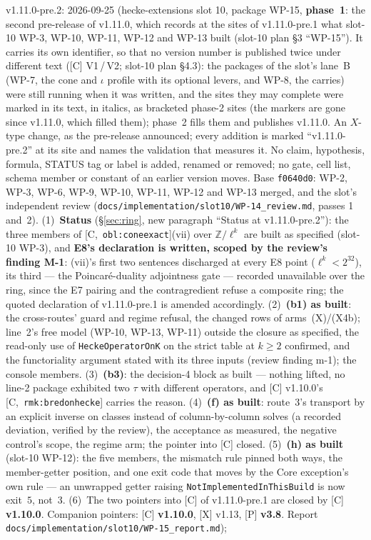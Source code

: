 \documentclass[11pt]{article}
\theoremstyle{remark}
\newcommand{\Z}{\mathbb{Z}}
\newcommand{\HA}[1]{[C,~\texttt{#1}]}      %
\begin{document}
v1.11.0-pre.2: 2026-09-25 (hecke-extensions slot 10, package WP-15,
\textbf{phase~1}: the second pre-release of v1.11.0, which records at the sites of
v1.11.0-pre.1 what slot-10 WP-3, WP-10, WP-11, WP-12 and WP-13 built (slot-10 plan \S3 ``WP-15'').
It carries its own identifier, so that no version number is published twice under different text
([C] V1\,/\,V2; slot-10 plan \S4.3): the packages of the slot's lane~B (WP-7, the cone and
$\iota$ profile with its optional levers, and WP-8, the carries) were still running when it was
written, and the sites they may complete were marked in its text, in italics, as bracketed
phase-2 sites (the markers are gone since v1.11.0, which filled them); phase~2 fills them and
publishes v1.11.0. An $X$-type change,
as the pre-release announced; every addition is marked ``v1.11.0-pre.2'' at its site and names the
validation that measures it. No claim, hypothesis, formula, STATUS tag or label is added, renamed
or removed; no gate, cell list, schema member or constant of an earlier version moves. Base
\texttt{f0640d0}: WP-2, WP-3, WP-6, WP-9, WP-10, WP-11, WP-12 and WP-13 merged, and the slot's
independent review (\texttt{docs/implementation/slot10/WP-14\_review.md}, passes 1 and~2).
(1)~\textbf{Status} (\S\ref{sec:ring}, new paragraph ``Status at v1.11.0-pre.2''): the three
members of \HA{obl:coneexact}(vii) over $\Z/\ell^k$ are built as specified (slot-10 WP-3), and
\textbf{E8's declaration is written, scoped by the review's finding M-1}: (vii)'s first two
sentences discharged at every E8 point ($\ell^k<2^{32}$), its third --- the Poincar\'e-duality
adjointness gate --- recorded unavailable over the ring, since the E7 pairing and the contragredient
refuse a composite ring; the quoted declaration of v1.11.0-pre.1 is amended accordingly.
(2)~\textbf{(b1) as built}: the cross-routes' guard and regime refusal, the changed rows of
arms~(X)/(X4b); line~2's free model (WP-10, WP-13, WP-11) outside the closure as specified, the
read-only use of \texttt{HeckeOperatorOnK} on the strict table at $k\ge2$ confirmed, and the
functoriality argument stated with its three inputs (review finding m-1); the console members.
(3)~\textbf{(b3)}: the decision-4 block as built --- nothing lifted, no line-2 package exhibited two
$\tau$ with different operators, and [C] v1.10.0's \HA{rmk:bredonhecke} carries the reason.
(4)~\textbf{(f) as built}: route~3's transport by an explicit inverse on classes instead of
column-by-column solves (a recorded deviation, verified by the review), the acceptance as measured,
the negative control's scope, the regime arm; the pointer into [C] closed.
(5)~\textbf{(h) as built} (slot-10 WP-12): the five members, the mismatch rule pinned both ways,
the member-getter position, and one exit code that moves by the Core exception's own rule --- an
unwrapped getter raising \texttt{NotImplementedInThisBuild} is now exit~$5$, not~$3$.
(6)~The two pointers into [C] of v1.11.0-pre.1 are closed by [C] \textbf{v1.10.0}.
Companion pointers: [C] \textbf{v1.10.0}, [X] v1.13, [P] \textbf{v3.8}. Report
\texttt{docs/implementation/slot10/WP-15\_report.md});
\end{document}
